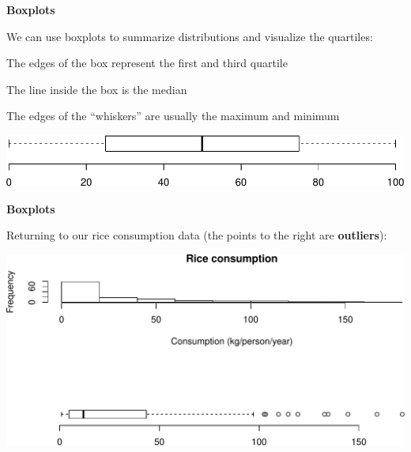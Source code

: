 \documentclass[ignorenonframetext,]{beamer}
\begin{document}
\begin{frame}{}
\protect\hypertarget{section-39}{}

\textbf{\large Boxplots}

We can use boxplots to summarize distributions and visualize the
quartiles:

\vspace{1ex}

The edges of the box represent the first and third quartile

\vspace{1ex}

The line inside the box is the median

\vspace{1ex}

The edges of the ``whiskers'' are usually the maximum and minimum

\vspace{1ex}\scriptsize

\includegraphics{lecture-03_files/figure-beamer/unnamed-chunk-21-1.pdf}

\end{frame}

\begin{frame}{}
\protect\hypertarget{section-40}{}

\textbf{\large Boxplots}

Returning to our rice consumption data (the points to the right are
\textbf{outliers}):

\vspace{1ex}\scriptsize

\includegraphics{lecture-03_files/figure-beamer/unnamed-chunk-22-1.pdf}

\end{frame}
\end{document}
